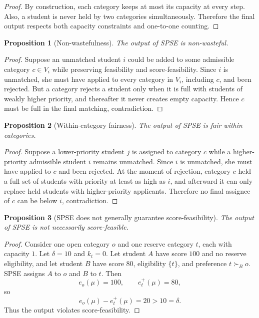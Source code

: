 \documentclass[12pt]{article}
\newtheorem{proposition}{Proposition}
\newcommand{\1}{\mathbf{1}}
\begin{document}
\begin{proof}
By construction, each category keeps at most its capacity at every step. Also, a student is never held by two categories simultaneously. Therefore the final output respects both capacity constraints and one-to-one counting.
\end{proof}

\begin{proposition}[Non-wastefulness]
The output of SPSE is non-wasteful.
\end{proposition}

\begin{proof}
Suppose an unmatched student $i$ could be added to some admissible category $c\in V_i$ while preserving feasibility and score-feasibility. Since $i$ is unmatched, she must have applied to every category in $V_i$, including $c$, and been rejected. But a category rejects a student only when it is full with students of weakly higher priority, and thereafter it never creates empty capacity. Hence $c$ must be full in the final matching, contradiction.
\end{proof}

\begin{proposition}[Within-category fairness]
The output of SPSE is fair within categories.
\end{proposition}

\begin{proof}
Suppose a lower-priority student $j$ is assigned to category $c$ while a higher-priority admissible student $i$ remains unmatched. Since $i$ is unmatched, she must have applied to $c$ and been rejected. At the moment of rejection, category $c$ held a full set of students with priority at least as high as $i$, and afterward it can only replace held students with higher-priority applicants. Therefore no final assignee of $c$ can be below $i$, contradiction.
\end{proof}

\begin{proposition}[SPSE does not generally guarantee score-feasibility]
The output of SPSE is not necessarily score-feasible.
\end{proposition}

\begin{proof}
Consider one open category $o$ and one reserve category $t$, each with capacity $1$. Let $\delta=10$ and $k_t=0$. Let student $A$ have score $100$ and no reserve eligibility, and let student $B$ have score $80$, eligibility $\{t\}$, and preference $t\succ_B o$. SPSE assigns $A$ to $o$ and $B$ to $t$. Then
\[
e_o(\mu)=100,\qquad e_t^+(\mu)=80,
\]
so
\[
e_o(\mu)-e_t^+(\mu)=20>10=\delta.
\]
Thus the output violates score-feasibility.
\end{proof}
\end{document}
